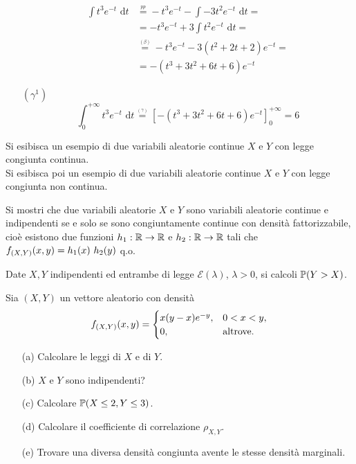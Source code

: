 \begin{enumerate}
\begin{gather*}
\begin{aligned}
\int t^3e^{-t}\text{ d}t&\overset{\underset{\textit{pp}}{}}{=}-t^3e^{-t}-\int-3t^2e^{-t}\text{ d}t=\\
&=-t^3e^{-t}+3\int t^2e^{-t}\text{ d}t=\\
&\overset{\underset{(\beta)}{}}{=}-t^3e^{-t}-3(t^2+2t+2)e^{-t}=\\
&=-(t^3+3t^2+6t+6)e^{-t}
\end{aligned}
\end{gather*}
\item [$(\gamma^1)$]
\begin{equation*}
\int_0^{+\infty} t^3e^{-t}\text{ d}t\overset{\underset{(\gamma)}{}}{=}\left[-(t^3+3t^2+6t+6)e^{-t}\right]_0^{+\infty}=6
\end{equation*}

\end{enumerate}


\newpage

\ParteEsercizi

\Esercizio{} %
Si esibisca un esempio di due variabili aleatorie continue $X$ e $Y$ con legge congiunta continua. \\
Si esibisca poi un esempio di due variabili aleatorie continue $X$ e $Y$ con legge congiunta non continua.

\Esercizio{$^\ast$}
Si mostri che due variabili aleatorie $X$ e $Y$ sono variabili aleatorie continue e indipendenti se e solo se sono congiuntamente continue con densità fattorizzabile, cioè esistono due funzioni $h_1:\mathbb{R}\to\mathbb{R}$ e $h_2:\mathbb{R}\to\mathbb{R}$ tali che $f_{(X,Y)}(x,y)=h_1(x)\ h_2(y)$ q.o.

\Esercizio{}
Date $X,Y$ indipendenti ed entrambe di legge $\mathcal{E}(\lambda)$, $\lambda>0$, si calcoli $\mathbb{P}(Y>X)$.

\Esercizio{}
Sia $(X,Y)$ un vettore aleatorio con densità
\begin{equation*}
f_{(X,Y)}(x,y)=\begin{cases} x(y-x)e^{-y},&0<x<y, \\ 0,&\text{altrove}.\end{cases}
\end{equation*}
\begin{enumerate}
\item [(a)] Calcolare le leggi di $X$ e di $Y$.
\item [(b)] $X$ e $Y$ sono indipendenti?
\item [(c)] Calcolare $\mathbb{P}(X\leq 2,Y\leq 3)$.
\item [(d)] Calcolare il coefficiente di correlazione $\rho_{X,Y}$.
\item [(e)] Trovare una diversa densità congiunta avente le stesse densità marginali.
\end{enumerate}

